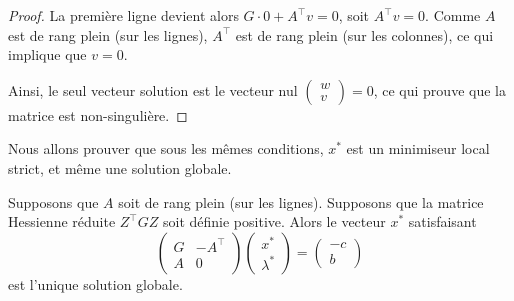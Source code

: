 \begin{proof}
    La première ligne devient alors $G \cdot 0 + A^\top v = 0$, soit $A^\top v = 0$.
    Comme $A$ est de rang plein (sur les lignes), $A^\top$ est de rang plein (sur les colonnes), ce qui implique que $v = 0$.
    
    Ainsi, le seul vecteur solution est le vecteur nul $\begin{pmatrix} w \\ v \end{pmatrix} = 0$, ce qui prouve que la matrice est non-singulière.
\end{proof}

Nous allons prouver que sous les mêmes conditions, $x^*$ est un minimiseur local strict, et même une solution globale.

\begin{theoreme}
    Supposons que $A$ soit de rang plein (sur les lignes). Supposons que la matrice Hessienne réduite $Z^\top G Z$ soit définie positive.
    Alors le vecteur $x^*$ satisfaisant
    \begin{equation}
        \begin{pmatrix}
            G & -A^\top \\
            A & 0
        \end{pmatrix}
        \begin{pmatrix}
            x^* \\
            \lambda^*
        \end{pmatrix}
        =
        \begin{pmatrix}
            -c \\
            b
        \end{pmatrix}
    \end{equation}
    est l'unique solution globale.
\end{theoreme}

